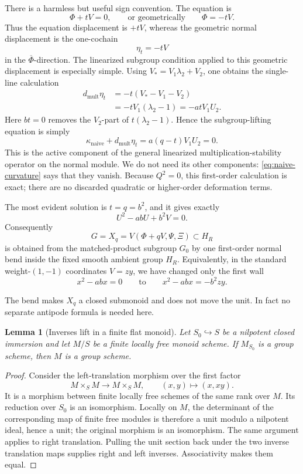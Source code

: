 \documentclass[11pt]{amsart}
\newtheorem{lemma}[theorem]{Lemma}
\theoremstyle{definition}
\theoremstyle{remark}
\begin{document}
There is a harmless but useful sign convention.  The equation is
\[
 \Phi+tV=0,
 \qquad\text{or geometrically}\qquad
 \Phi=-tV.
\]
Thus the equation displacement is \(+tV\), whereas the geometric normal
displacement is the one-cochain
\[
 \eta_t=-tV
\]
in the \(\overline\Phi\)-direction.  The linearized subgroup condition
applied to this geometric displacement is especially simple.  Using
\(V_*=V_1\lambda_2+V_2\), one obtains the single-line calculation
\begin{equation}\label{eq:bridge-coboundary}
 \begin{split}
  d_{\mathrm{mult}}\eta_t
  &=-t(V_*-V_1-V_2)\\
  &=-tV_1(\lambda_2-1)
   =-atV_1U_2.
 \end{split}
\end{equation}
Here \(bt=0\) removes the \(V_2\)-part of
\(t(\lambda_2-1)\).  Hence the subgroup-lifting equation is simply
\[
 \kappa_{\mathrm{naive}}+d_{\mathrm{mult}}\eta_t
 =a(q-t)V_1U_2=0.
\]
This is the active component of the general linearized
multiplication-stability operator on the normal module.  We do not need
its other components: \eqref{eq:naive-curvature} says that they vanish.
Because \(Q^2=0\), this first-order calculation is exact; there are no
discarded quadratic or higher-order deformation terms.

The most evident solution is \(t=q=b^2\), and it gives exactly
\[
 U^2-abU+b^2V=0.
\]
Consequently
\begin{equation}\label{eq:counterexample-as-bend}
 G=X_q=V(\Phi+qV,\Psi,\Xi)\subset H_R
\end{equation}
is obtained from the matched-product subgroup \(G_0\) by one first-order
normal bend inside the fixed smooth ambient group \(H_R\).  Equivalently,
in the standard weight-\((1,-1)\) coordinates \(V=zy\), we have changed
only the first wall
\[
 x^2-abx=0
 \qquad\text{to}\qquad
 x^2-abx=-b^2zy.
\]

The bend makes \(X_q\) a closed submonoid and does not move the unit.
In fact no separate antipode formula is needed here.

\begin{lemma}[Inverses lift in a finite flat monoid]
\label{lem:monoid-lifts-group}
Let \(S_0\hookrightarrow S\) be a nilpotent closed immersion and let
\(M/S\) be a finite locally free monoid scheme.  If \(M_{S_0}\) is a
group scheme, then \(M\) is a group scheme.
\end{lemma}

\begin{proof}
Consider the left-translation morphism over the first factor
\[
 M\times_SM\longrightarrow M\times_SM,
 \qquad (x,y)\longmapsto(x,xy).
\]
It is a morphism between finite locally free schemes of the same rank
over \(M\).  Its reduction over \(S_0\) is an isomorphism.  Locally on
\(M\), the determinant of the corresponding map of finite free modules
is therefore a unit modulo a nilpotent ideal, hence a unit; the original
morphism is an isomorphism.  The same argument applies to right
translation.  Pulling the unit section back under the two inverse
translation maps supplies right and left inverses.  Associativity makes
them equal.
\end{proof}
\end{document}
